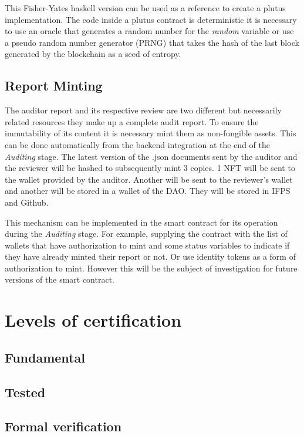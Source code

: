 \documentclass[12pt]{article}
\begin{document}
This Fisher-Yates haskell version can be used as a reference to create a plutus implementation. The code inside a plutus contract is deterministic it is necessary to use an oracle that generates a random number for the \emph {random} variable or use a pseudo random number generator (PRNG) that takes the hash of the last block generated by the blockchain as a seed of entropy.

\subsection { Report Minting }

The auditor report and its respective review are two different but necessarily related resources they make up a complete audit report. To ensure the immutability of its content it is necessary mint them as non-fungible assets. This can be done automatically from the backend integration at the end of the \emph{Auditing} stage. 
The latest version of the .json documents sent by the auditor and the reviewer will be hashed to subsequently mint 3 copies. 1 NFT will be sent to the wallet provided by the auditor. Another will be sent to the reviewer's wallet and another will be stored in a wallet of the DAO. They will be stored in IFPS and Github.

This mechanism can be implemented in the smart contract for its operation during the \emph{Auditing} stage. For example, supplying the contract with the list of wallets that have authorization to mint and some status variables to indicate if they have already minted their report or not. Or use identity tokens as a form of authorization to mint. However this will be the subject of investigation for future versions of the smart contract.


\section{ Levels of certification }


\subsection { Fundamental }


\subsection { Tested }


\subsection { Formal verification }
\end{document}
